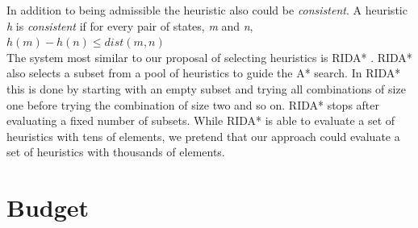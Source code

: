 \documentclass[11pt,a4paper,oneside]{report}
\begin{document}
In addition to being admissible the heuristic also could be \textit{consistent}. A heuristic \textit{h} is \textit{consistent} if for every pair of states, \textit{m} and \textit{n}, $h(m) - h(n) \leq dist(m, n)$\\

The system most similar to our proposal of selecting heuristics is RIDA* \citep{BarleySantiagoOver}. RIDA* also selects a subset from a pool of heuristics to guide the A* search. In RIDA* this is done by starting with an empty subset and trying all combinations of size one before trying the combination of size two and so on. RIDA* stops after evaluating a fixed number of subsets. While RIDA* is able to evaluate a set of heuristics with tens of elements, we pretend that our approach could evaluate a set of heuristics with thousands of elements.\\
\newpage

\section{Budget}
\end{document}
